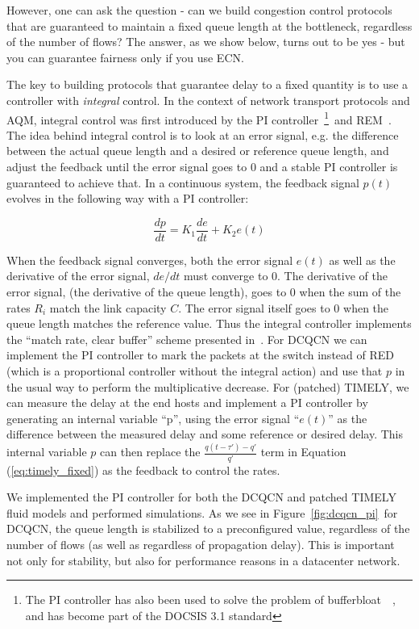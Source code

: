 However, one can ask the question - can we build congestion control protocols
that are guaranteed to maintain a fixed queue length at the bottleneck,
regardless of the number of flows? The answer, as we show below, turns out to be
yes - but you can guarantee fairness only if you use ECN.

The key to building protocols that guarantee delay to a fixed quantity
is to use a controller with \emph{integral} control. In the context of
network transport protocols and AQM, integral control was first introduced
by the PI controller~\cite{hollot2001designing}\footnote{ 
The PI controller has also been used to solve the problem of bufferbloat~\cite{conf/hpsr/PanNPPSBV13,bufferbloat-pi}~, and
has become part of the DOCSIS 3.1 standard}~and
REM~\cite{REM}.
The idea behind integral control is to look at an
error signal, e.g. the difference between the actual queue length and
a desired or reference queue length, and adjust the feedback until the
error signal goes to 0 and a stable PI controller is guaranteed to
achieve that. In a continuous system, the feedback signal $p(t)$
evolves in the following way with a PI controller:

$$ \frac{dp}{dt} = K_1\frac{de}{dt}+K_2e(t) $$

When the feedback signal converges, both the error signal $e(t)$ as
well as the derivative of the error signal, $de/dt$ must converge to
0. The derivative of the error signal, (the derivative of the queue length), goes to 0
when the sum of the rates $R_i$ match the link capacity $C$. The error signal itself goes to 0
when the queue length matches the reference value. Thus the integral
controller implements the ``match rate, clear buffer'' scheme
presented in~\cite{REM}. For DCQCN we can implement the PI
controller to mark the packets at the switch instead of RED (which is
a proportional controller without the integral action) and use that
$p$ in the usual way to perform the multiplicative decrease. For
(patched) TIMELY, we can
measure the delay at the end hosts and implement a PI controller by
generating an internal variable ``p'', using the error signal
``$e(t)$'' as the difference between the measured delay and some
reference or desired delay. This internal variable $p$ can then
replace the $\frac{{q(t - \tau ') - q'}}{{q'}}$ term in
Equation (\ref{eq:timely_fixed}) as the feedback to control the rates.

We implemented the PI controller for both the DCQCN and patched TIMELY
fluid models and performed simulations. As we see in
Figure~\ref{fig:dcqcn_pi}~for DCQCN, the queue length is stabilized to a
preconfigured value, regardless of the number of flows (as well as
regardless of propagation delay). This is important not only for
stability, but also for performance reasons in a datacenter network.

